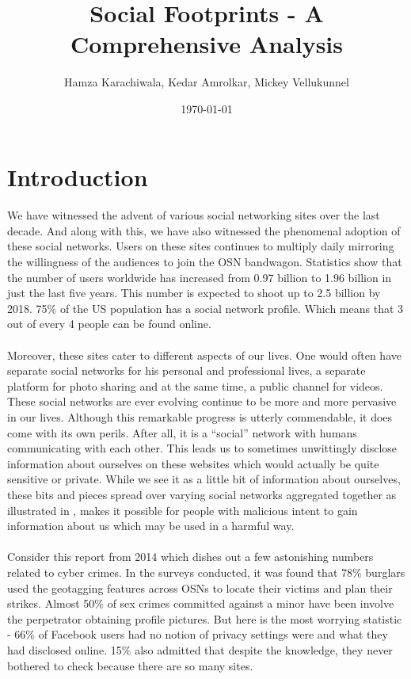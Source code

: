 \documentclass[11pt]{article}
\title{Social Footprints - A Comprehensive Analysis}
\author{Hamza Karachiwala, Kedar Amrolkar, Mickey Vellukunnel}
\date{\today}
\begin{document}
\maketitle
{}

\section{Introduction}
\paragraph{}
We have witnessed the advent of various social networking sites over the last decade. And along with this, we have also witnessed the phenomenal adoption of these social networks. Users on these sites continues to multiply daily mirroring the willingness of the audiences to join the OSN bandwagon. Statistics show\cite{statswebsite} that the number of users worldwide has increased from 0.97 billion to 1.96 billion in just the last five years. This number is expected to shoot up to 2.5 billion by 2018. 75\% of the US population has a social network profile. Which means that 3 out of every 4 people can be found online.
\paragraph{}
Moreover, these sites cater to different aspects of our lives. One would often have separate social networks for his personal and professional lives, a separate platform for photo sharing and at the same time, a public channel for videos. These social networks are ever evolving continue to be more and more pervasive in our lives. Although this remarkable progress is utterly commendable, it does come with its own perils. After all, it is a ``social'' network with humans communicating with each other. This leads us to sometimes unwittingly disclose information about ourselves on these websites which would actually be quite sensitive or private. While we see it as a little bit of information about ourselves, these bits and pieces spread over varying social networks aggregated together as illustrated in \cite{privacypaper}, makes it possible for people with malicious intent to gain information about us which may be used in a harmful way.
\paragraph{}
Consider this report\cite{newsarticle} from 2014 which dishes out a few astonishing numbers related to cyber crimes. In the surveys conducted, it was found that 78\% burglars used the geotagging features across OSNs to locate their victims and plan their strikes. Almost 50\% of sex crimes committed against a minor have been involve the perpetrator obtaining profile pictures. But here is the most worrying statistic - 66\% of Facebook users had no notion of privacy settings were and what they had disclosed online. 15\% also admitted that despite the knowledge, they never bothered to check because there are so many sites.
\end{document}
